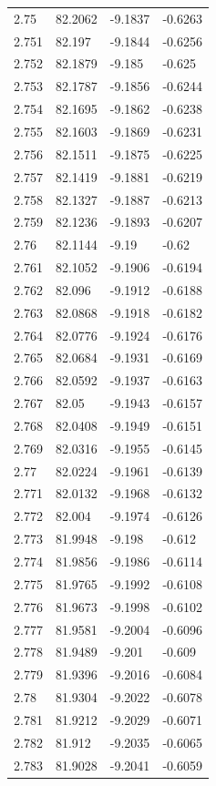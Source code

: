 \begin{tabular}{llll}
2.75 & 82.2062 & -9.1837 & -0.6263 \\
2.751 & 82.197 & -9.1844 & -0.6256 \\
2.752 & 82.1879 & -9.185 & -0.625 \\
2.753 & 82.1787 & -9.1856 & -0.6244 \\
2.754 & 82.1695 & -9.1862 & -0.6238 \\
2.755 & 82.1603 & -9.1869 & -0.6231 \\
2.756 & 82.1511 & -9.1875 & -0.6225 \\
2.757 & 82.1419 & -9.1881 & -0.6219 \\
2.758 & 82.1327 & -9.1887 & -0.6213 \\
2.759 & 82.1236 & -9.1893 & -0.6207 \\
2.76 & 82.1144 & -9.19 & -0.62 \\
2.761 & 82.1052 & -9.1906 & -0.6194 \\
2.762 & 82.096 & -9.1912 & -0.6188 \\
2.763 & 82.0868 & -9.1918 & -0.6182 \\
2.764 & 82.0776 & -9.1924 & -0.6176 \\
2.765 & 82.0684 & -9.1931 & -0.6169 \\
2.766 & 82.0592 & -9.1937 & -0.6163 \\
2.767 & 82.05 & -9.1943 & -0.6157 \\
2.768 & 82.0408 & -9.1949 & -0.6151 \\
2.769 & 82.0316 & -9.1955 & -0.6145 \\
2.77 & 82.0224 & -9.1961 & -0.6139 \\
2.771 & 82.0132 & -9.1968 & -0.6132 \\
2.772 & 82.004 & -9.1974 & -0.6126 \\
2.773 & 81.9948 & -9.198 & -0.612 \\
2.774 & 81.9856 & -9.1986 & -0.6114 \\
2.775 & 81.9765 & -9.1992 & -0.6108 \\
2.776 & 81.9673 & -9.1998 & -0.6102 \\
2.777 & 81.9581 & -9.2004 & -0.6096 \\
2.778 & 81.9489 & -9.201 & -0.609 \\
2.779 & 81.9396 & -9.2016 & -0.6084 \\
2.78 & 81.9304 & -9.2022 & -0.6078 \\
2.781 & 81.9212 & -9.2029 & -0.6071 \\
2.782 & 81.912 & -9.2035 & -0.6065 \\
2.783 & 81.9028 & -9.2041 & -0.6059 \\

\end{tabular}
